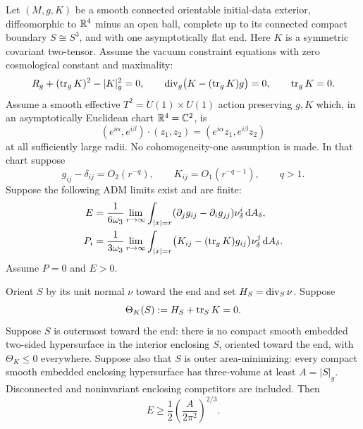 \begin{theorem}\label{four:maximal:thm:main}
Let \((M,g,K)\) be a smooth connected orientable initial-data exterior,
diffeomorphic to \(\mathbb R^4\) minus an open ball, complete up to its connected
compact boundary \(S\cong S^3\), and with one asymptotically flat end.
Here \(K\) is a symmetric covariant two-tensor. Assume the vacuum constraint
equations with zero cosmological constant and maximality:
\begin{equation}\label{four:maximal:intro:constraints}
 R_g+(\operatorname{tr}_gK)^2-|K|_g^2=0,\qquad
 \operatorname{div}_g\bigl(K-(\operatorname{tr}_gK)g\bigr)=0,\qquad \operatorname{tr}_gK=0.
\end{equation}
Assume a smooth effective \(T^2=U(1)\times U(1)\) action preserving \(g,K\)
which, in an asymptotically Euclidean chart \(\mathbb R^4=\mathbb C^2\), is
\[
 (e^{i\alpha},e^{i\beta})\cdot(z_1,z_2)
       =(e^{i\alpha}z_1,e^{i\beta}z_2)
\]
at all sufficiently large radii. No cohomogeneity-one assumption is made.
In that chart suppose
\begin{equation}\label{four:maximal:intro:decay}
 g_{ij}-\delta_{ij}=O_2(r^{-q}),\qquad
 K_{ij}=O_1(r^{-q-1}),\qquad q>1.
\end{equation}
Suppose the following ADM limits exist and are finite:
\begin{align}
 E&=\frac{1}{6\omega_3}\lim_{r\to\infty}
     \int_{|x|=r}(\partial_jg_{ij}-\partial_ig_{jj})
                  \nu_\delta^i\,\mathrm d A_\delta,\label{four:maximal:intro:energy}\\
 P_i&=\frac{1}{3\omega_3}\lim_{r\to\infty}
     \int_{|x|=r}\bigl(K_{ij}-(\operatorname{tr}_gK)g_{ij}\bigr)
                  \nu_\delta^j\,\mathrm d A_\delta.\label{four:maximal:intro:momentum}
\end{align}
Assume \(P=0\) and \(E>0\).

Orient \(S\) by its unit normal \(\nu\) toward the end and set
\(H_S=\operatorname{div}_S\nu\). Suppose
\begin{equation}\label{four:maximal:intro:mots}
 \Theta_K(S):=H_S+\operatorname{tr}_SK=0.
\end{equation}
Suppose \(S\) is outermost toward the end: there is no compact smooth
embedded two-sided hypersurface in the interior enclosing \(S\), oriented
toward the end, with \(\Theta_K\le0\) everywhere. Suppose also that \(S\)
is outer area-minimizing: every compact smooth embedded enclosing
hypersurface has three-volume at least \(A=|S|_g\). Disconnected and
noninvariant enclosing competitors are included.
Then
\begin{equation}\label{four:maximal:intro:main-inequality}
 E\ge\frac12\left(\frac{A}{2\pi^2}\right)^{2/3}.
\end{equation}
\end{theorem}

